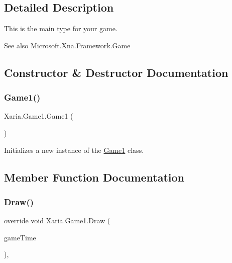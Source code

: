 \subsection{Detailed Description}
This is the main type for your game. 

\begin{DoxySeeAlso}{See also}
Microsoft.\+Xna.\+Framework.\+Game


\end{DoxySeeAlso}


\subsection{Constructor \& Destructor Documentation}
\mbox{\label{classXaria_1_1Game1_aa7b8268d52c2f0435734c83f3d76f266}} 
\subsubsection{\texorpdfstring{Game1()}{Game1()}}
{\footnotesize\ttfamily Xaria.\+Game1.\+Game1 (\begin{DoxyParamCaption}{ }\end{DoxyParamCaption})\hspace{0.3cm}{\ttfamily [inline]}}



Initializes a new instance of the \hyperlink{classXaria_1_1Game1}{Game1} class. 



\subsection{Member Function Documentation}
\mbox{\label{classXaria_1_1Game1_a5dce3a85b3eba6685d04d309bcd6e1c0}} 
\subsubsection{\texorpdfstring{Draw()}{Draw()}}
{\footnotesize\ttfamily override void Xaria.\+Game1.\+Draw (\begin{DoxyParamCaption}\item[{Game\+Time}]{game\+Time }\end{DoxyParamCaption})\hspace{0.3cm}{\ttfamily [inline]}, {\ttfamily [protected]}}



